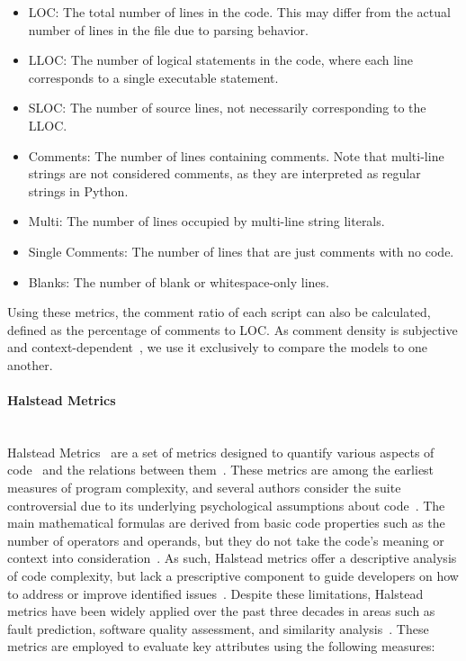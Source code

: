 \documentclass{DESSThesis}
\begin{document}
\begin{itemize}
\item LOC: The total number of lines in the code. This may differ from the actual number of lines in the file due to parsing behavior.
\item LLOC: The number of logical statements in the code, where each line corresponds to a single executable statement.
\item SLOC: The number of source lines, not necessarily corresponding to the LLOC.
\item Comments: The number of lines containing comments. Note that multi-line strings are not considered comments, as they are interpreted as regular strings in Python.
\item Multi: The number of lines occupied by multi-line string literals.
\item Single Comments: The number of lines that are just comments with no code.
\item Blanks: The number of blank or whitespace-only lines.
\end{itemize}

Using these metrics, the comment ratio of each script can also be calculated, defined as the percentage of comments to LOC. As comment density is subjective and context-dependent~\cite{10.1145/3338906.3342494}, we use it exclusively to compare the models to one another.

\paragraph{Halstead Metrics}\mbox{}\\

\noindent Halstead Metrics~\cite{10.5555/540137} are a set of metrics designed to quantify various aspects of code~\cite{takerngsaksiri2025codereadabilityagelarge} and the relations between them~\cite{radon}. These metrics are among the earliest measures of program complexity, and several authors consider the suite controversial due to its underlying psychological assumptions about code~\cite{bucur2006quality}. The main mathematical formulas are derived from basic code properties such as the number of operators and operands, but they do not take the code's meaning or context into consideration~\cite{bucur2006quality}. As such, Halstead metrics offer a descriptive analysis of code complexity, but lack a prescriptive component to guide developers on how to address or improve identified issues~\cite{bucur2006quality}. Despite these limitations, Halstead metrics have been widely applied over the past three decades in areas such as fault prediction, software quality assessment, and similarity analysis~\cite{bucur2006quality, khan_evaluating_2023}. These metrics are employed to evaluate key attributes using the following measures:
\end{document}
